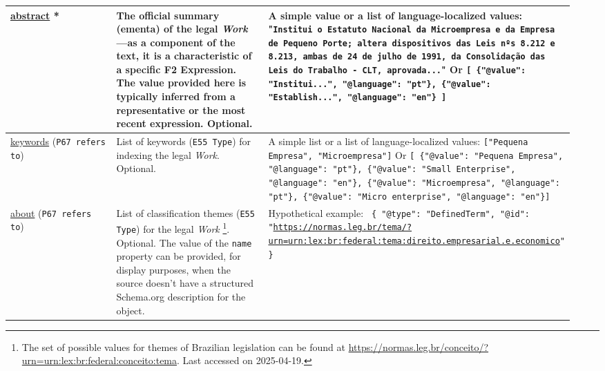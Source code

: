 \documentclass[11pt]{article}
\begin{document}
\begin{longtable}{p{0.25\linewidth} p{0.35\linewidth} p{0.35\linewidth}}
\url{abstract} * & The official summary (ementa) of the legal \emph{Work}---as a component of the text, it is a characteristic of a specific F2 Expression. The value provided here is typically inferred from a representative or the most recent expression. Optional. & A simple value or a list of language-localized values: \newline "\texttt{Institui o Estatuto Nacional da Microempresa e da Empresa de Pequeno Porte; altera dispositivos das Leis nºs 8.212 e 8.213, ambas de 24 de julho de 1991, da Consolidação das Leis do Trabalho - CLT, aprovada...}" \newline Or \newline \texttt{[ \newline\{"@value": "Institui...", \newline "@language": "pt"\}, \newline \{"@value": "Establish...", \newline"@language": "en"\} \newline ]} \\
\midrule

\url{keywords} \newline (\texttt{P67 refers to}) & List of keywords (\texttt{E55 Type}) for indexing the legal \emph{Work}. Optional. & A simple list or a list of language-localized values: \newline \texttt{["Pequena Empresa", "Microempresa"]} \newline Or \newline \texttt{[ \newline \{"@value": "Pequena Empresa", \newline "@language": "pt"\}, \newline \{"@value": "Small Enterprise", \newline "@language": "en"\}, \newline \{"@value": "Microempresa", \newline "@language": "pt"\}, \newline \{"@value": "Micro enterprise", \newline "@language": "en"\}\newline ]} \\
\midrule

\url{about} \newline (\texttt{P67 refers to}) & List of classification themes (\texttt{E55 Type}) for the legal \emph{Work} \footnote{The set of possible values for themes of Brazilian legislation can be found at \url{https://normas.leg.br/conceito/?urn=urn:lex:br:federal:conceito:tema}. Last accessed on 2025-04-19.}. Optional. \newline The value of the \texttt{name} property can be provided, for display purposes, when the source doesn't have a structured Schema.org description for the object. & Hypothetical example: \newline \texttt{ \newline \{ "@type": "DefinedTerm", "@id": "\url{https://normas.leg.br/tema/?urn=urn:lex:br:federal:tema:direito.empresarial.e.economico}" \}\newline } \\
\midrule


\end{longtable}
\end{document}
